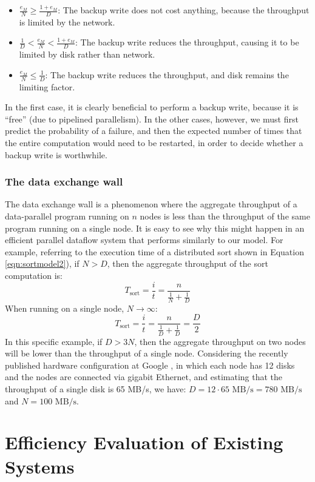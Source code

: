 \documentclass{acm_proc_article-sp}
\begin{document}
\begin{itemize}
  \item $\frac{e_M}{N} \ge \frac{1+e_M}{D}$: The backup write does not cost anything, because the throughput is limited by the network.
  \item $\frac{1}{D} < \frac{e_M}{N} < \frac{1+e_M}{D}$: The backup write reduces the throughput, causing it to be limited by disk rather than network.
  \item $\frac{e_M}{N} \le \frac{1}{D}$: The backup write reduces the throughput, and disk remains the limiting factor. 
\end{itemize}

In the first case, it is clearly beneficial to perform a backup write, because it is ``free'' (due to pipelined parallelism). In the other cases, however, we must first predict the probability of a failure, and then the expected number of times that the entire computation would need to be restarted, in order to decide whether a backup write is worthwhile.

\subsubsection{The data exchange wall}

The data exchange wall is a phenomenon where the aggregate throughput of a data-parallel program running on $n$ nodes is less than the throughput of the same program running on a single node. It is easy to see why this might happen in an efficient parallel dataflow system that performs similarly to our model. For example, referring to the execution time of a distributed sort shown in Equation \ref{eqn:sortmodel2}), if $N > D$, then the aggregate throughput of the sort computation is:
\[T_\text{sort} = \frac{i}{t} = \frac{n}{\frac{1}{N} + \frac{1}{D}}\]
When running on a single node, $N \to \infty$:
\[T_\text{sort} = \frac{i}{t} = \frac{n}{\frac{1}{D} + \frac{1}{D}} = \frac{D}{2}\]
In this specific example, if $D > 3 N$, then the aggregate throughput on two nodes will be lower than the throughput of a single node. Considering the recently published hardware configuration at Google \cite{sorting1pb}, in which each node has 12 disks and the nodes are connected via gigabit Ethernet, and estimating that the throughput of a single disk is 65 MB/s, we have: $D = 12 \cdot 65 \text{ MB/s} = 780 \text{ MB/s}$ and $N = 100 \text{ MB/s}$.

\section{Efficiency Evaluation of Existing Systems}
\end{document}
